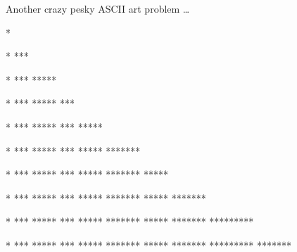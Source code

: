 Another crazy pesky  ASCII art problem \dots

\resett
\nextt
\begin{console}[commandchars=\\\{\}]
*
\end{console}

\nextt
\begin{console}[commandchars=\\\{\}]
 *
***
\end{console}

\nextt
\begin{console}[commandchars=\\\{\}]
  *
 ***
*****
\end{console}

\nextt
\begin{console}[commandchars=\\\{\}]
  *
 ***
*****
 *** 
\end{console}

\nextt
\begin{console}[commandchars=\\\{\}]
  *
 ***
*****
 ***
*****
\end{console}

\nextt
\begin{console}[commandchars=\\\{\}]
   *
  ***
 *****
  ***
 *****
*******
\end{console}

\nextt
\begin{console}[commandchars=\\\{\}]
   *
  ***
 *****
  ***
 *****
*******
 *****
\end{console}

\nextt
\begin{console}[commandchars=\\\{\}]
   *
  ***
 *****
  ***
 *****
*******
 *****
*******
\end{console}

\nextt
\begin{console}[commandchars=\\\{\}]
    *
   ***
  *****
   ***
  *****
 *******
  *****
 *******
*********
\end{console}

\nextt
\begin{console}[commandchars=\\\{\}]
    *
   ***
  *****
   ***
  *****
 *******
  *****
 *******
*********
 *******
\end{console}

